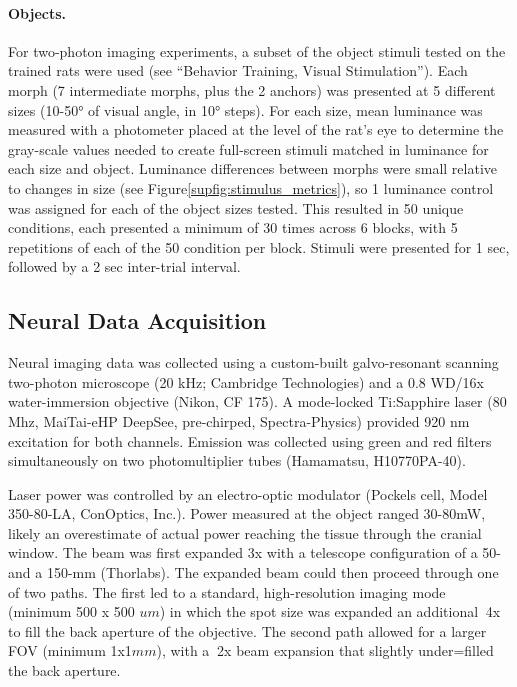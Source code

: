\paragraph{Objects.}
For two-photon imaging experiments, a subset of the object stimuli tested on the trained rats were used (see ``Behavior Training, Visual Stimulation''). Each morph (7 intermediate morphs, plus the 2 anchors) was presented at 5 different sizes (10-\ang{50} of visual angle, in \ang{10} steps). For each size, mean luminance was measured with a photometer placed at the level of the rat's eye to determine the gray-scale values needed to create full-screen stimuli matched in luminance for each size and object. Luminance differences between morphs were small relative to changes in size (see Figure\ref{supfig:stimulus_metrics}), so 1 luminance control was assigned for each of the object sizes tested. This resulted in 50 unique conditions, each presented a minimum of 30 times across 6 blocks, with 5 repetitions of each of the 50 condition per block. Stimuli were presented for 1 sec, followed by a 2 sec inter-trial interval. 


\subsection{Neural Data Acquisition}
Neural imaging data was collected using a custom-built galvo-resonant scanning two-photon microscope (20 kHz; Cambridge Technologies) and a 0.8 WD/16x water-immersion objective (Nikon, CF 175). A mode-locked Ti:Sapphire laser (80 Mhz, MaiTai-eHP DeepSee, pre-chirped, Spectra-Physics) 
provided 920 nm excitation for both channels. Emission was collected using green and red filters simultaneously on two photomultiplier tubes (Hamamatsu, H10770PA-40).

Laser power was controlled by an electro-optic modulator (Pockels cell, Model 350-80-LA, ConOptics, Inc.). Power measured at the object ranged 30-80mW, likely an overestimate of actual power reaching the tissue through the cranial window. The beam was first expanded 3x with a telescope configuration of a 50- and a 150-mm (Thorlabs). The expanded beam could then proceed through one of two paths. The first led to a standard, high-resolution imaging mode (minimum 500 x 500 $um$) in which the spot size was expanded an additional $~$4x to fill the back aperture of the objective. The second path allowed for a larger FOV (minimum 1x1$mm$), with a $~$2x beam expansion that slightly under=filled the back aperture. 

